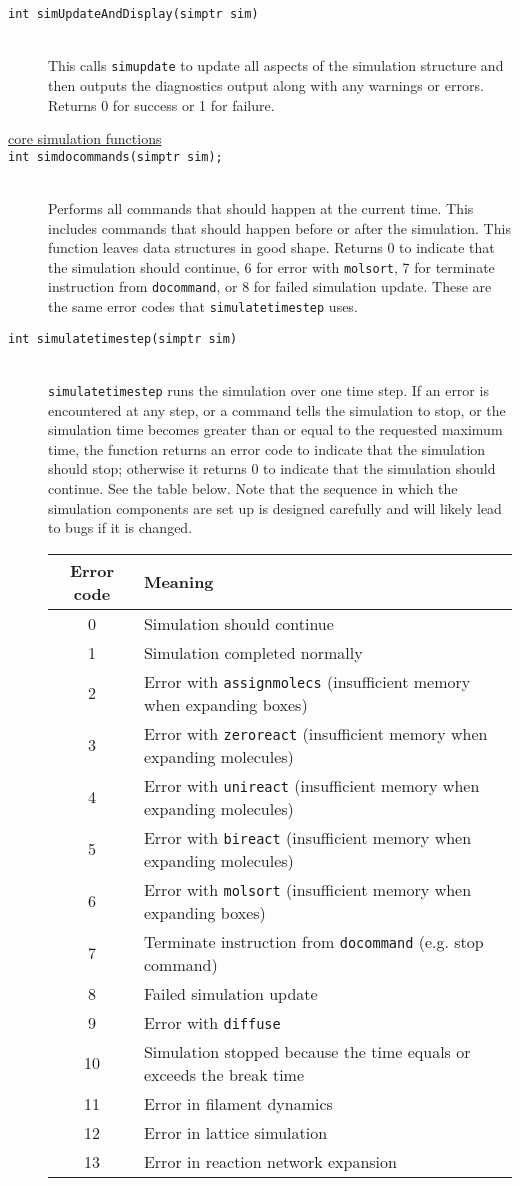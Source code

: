 \documentclass {scrbook}
\newcommand {\ttt} {\texttt}
\begin{document}
\begin{description}
\item[\ttt{int simUpdateAndDisplay(simptr sim)}]
\hfill \\
This calls \ttt{simupdate} to update all aspects of the simulation structure and then outputs the diagnostics output along with any warnings or errors. Returns 0 for success or 1 for failure.

\item[\underline{core simulation functions}]

\item[\ttt{int simdocommands(simptr sim);}]
\hfill \\
Performs all commands that should happen at the current time. This includes commands that should happen before or after the simulation. This function leaves data structures in good shape. Returns 0 to indicate that the simulation should continue, 6 for error with \ttt{molsort}, 7 for terminate instruction from \ttt{docommand}, or 8 for failed simulation update. These are the same error codes that \ttt{simulatetimestep} uses.

\item[\ttt{int simulatetimestep(simptr sim)}]
\hfill \\
\ttt{simulatetimestep} runs the simulation over one time step. If an error is encountered at any step, or a command tells the simulation to stop, or the simulation time becomes greater than or equal to the requested maximum time, the function returns an error code to indicate that the simulation should stop; otherwise it returns 0 to indicate that the simulation should continue. See the table below. Note that the sequence in which the simulation components are set up is designed carefully and will likely lead to bugs if it is changed.

\begin{longtable}[c]{cl}
Error code&Meaning\\
\hline
0&Simulation should continue\\
1&Simulation completed normally\\
2&Error with \ttt{assignmolecs} (insufficient memory when expanding boxes)\\
3&Error with \ttt{zeroreact} (insufficient memory when expanding molecules)\\
4&Error with \ttt{unireact} (insufficient memory when expanding molecules)\\
5&Error with \ttt{bireact} (insufficient memory when expanding molecules)\\
6&Error with \ttt{molsort} (insufficient memory when expanding boxes)\\
7&Terminate instruction from \ttt{docommand} (e.g. stop command)\\
8&Failed simulation update\\
9&Error with \ttt{diffuse}\\
10&Simulation stopped because the time equals or exceeds the break time\\
11&Error in filament dynamics\\
12&Error in lattice simulation\\
13&Error in reaction network expansion
\end{longtable}


\end{description}
\end{document}
